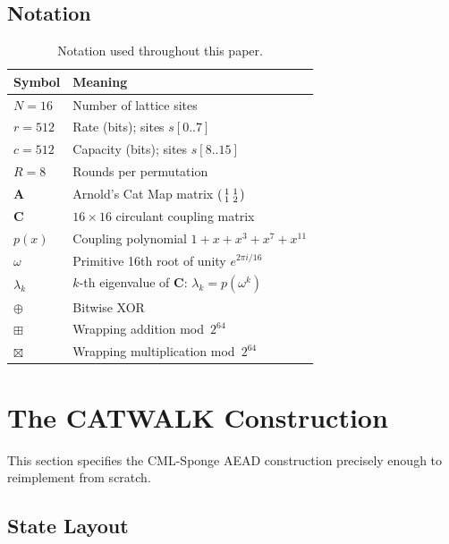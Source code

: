 \documentclass[runningheads]{llncs}
\newcommand{\catmap}{\mathbf{A}}
\newcommand{\coupmat}{\mathbf{C}}
\begin{document}
\subsection{Notation}

\begin{table}[h]
\centering
\caption{Notation used throughout this paper.}
\label{tab:notation}
\begin{tabular}{@{}ll@{}}
\toprule
Symbol & Meaning \\
\midrule
$N = 16$ & Number of lattice sites \\
$r = 512$ & Rate (bits); sites $s[0..7]$ \\
$c = 512$ & Capacity (bits); sites $s[8..15]$ \\
$R = 8$ & Rounds per permutation \\
$\catmap$ & Arnold's Cat Map matrix $\begin{psmallmatrix}1&1\\1&2\end{psmallmatrix}$ \\
$\coupmat$ & $16 \times 16$ circulant coupling matrix \\
$p(x)$ & Coupling polynomial $1 + x + x^3 + x^7 + x^{11}$ \\
$\omega$ & Primitive 16th root of unity $e^{2\pi i/16}$ \\
$\lambda_k$ & $k$-th eigenvalue of $\coupmat$: $\lambda_k = p(\omega^k)$ \\
$\oplus$ & Bitwise XOR \\
$\boxplus$ & Wrapping addition mod~$2^{64}$ \\
$\boxtimes$ & Wrapping multiplication mod~$2^{64}$ \\
\bottomrule
\end{tabular}
\end{table}

\section{The CATWALK Construction}
\label{sec:construction}

This section specifies the CML-Sponge AEAD construction precisely enough
to reimplement from scratch.

\subsection{State Layout}
\end{document}
